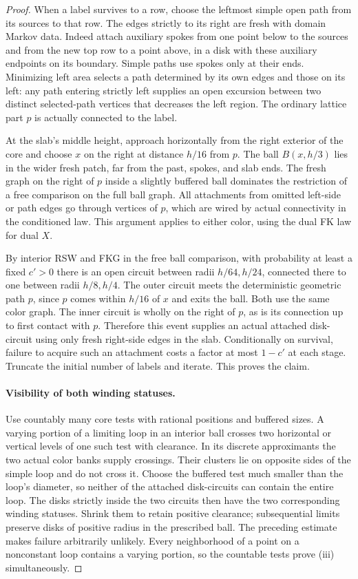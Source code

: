 \begin{proof}
When a label survives to a row, choose the leftmost simple open path
from its sources to that row.  The edges strictly to its right are
fresh with domain Markov data.  Indeed attach auxiliary spokes from
one point below to the sources and from the new top row to a point
above, in a disk with these auxiliary endpoints on its boundary.
Simple paths use spokes only at their ends.  Minimizing left area
selects a path determined by its own edges and those on its left:
any path entering strictly left supplies an open excursion between
two distinct selected-path vertices that decreases the left region.
The ordinary lattice part $p$ is actually connected to the label.

At the slab's middle height, approach horizontally from the right
exterior of the core and choose $x$ on the right at distance $h/16$
from $p$.  The ball $B(x,h/3)$ lies in the wider fresh patch, far
from the past, spokes, and slab ends.  The fresh graph on the right
of $p$ inside a slightly buffered ball dominates the restriction of a
free comparison on the full ball graph.  All attachments from omitted
left-side or path edges go through vertices of $p$, which are wired
by actual connectivity in the conditioned law.  This argument applies
to either color, using the dual FK law for dual $X$.

By interior RSW and FKG in the free ball comparison, with probability
at least a fixed $c'>0$ there is an open circuit between radii
$h/64,h/24$, connected there to one between radii $h/8,h/4$.
The outer circuit meets the deterministic geometric path $p$, since
$p$ comes within $h/16$ of $x$ and exits the ball.  Both use the same
color graph.  The inner circuit is wholly on the right of $p$, as is
its connection up to first contact with $p$.  Therefore this event
supplies an actual attached disk-circuit using only fresh right-side
edges in the slab.  Conditionally on survival, failure to acquire such
an attachment costs a factor at most $1-c'$ at each stage.  Truncate
the initial number of labels and iterate.  This proves the claim.

\paragraph{Visibility of both winding statuses.}
Use countably many core tests with rational positions and buffered
sizes.  A varying portion of a limiting loop in an interior ball
crosses two horizontal or vertical levels of one such test with
clearance.  In its discrete approximants the two actual color banks
supply crossings.  Their clusters lie on opposite sides of the simple
loop and do not cross it.  Choose the buffered test much smaller than
the loop's diameter, so neither of the attached disk-circuits can
contain the entire loop.  The disks strictly inside the two circuits
then have the two corresponding winding statuses.  Shrink them to
retain positive clearance; subsequential limits preserve disks of
positive radius in the prescribed ball.  The preceding estimate makes
failure arbitrarily unlikely.  Every neighborhood of a point on a
nonconstant loop contains a varying portion, so the countable tests
prove (iii) simultaneously.
\end{proof}

